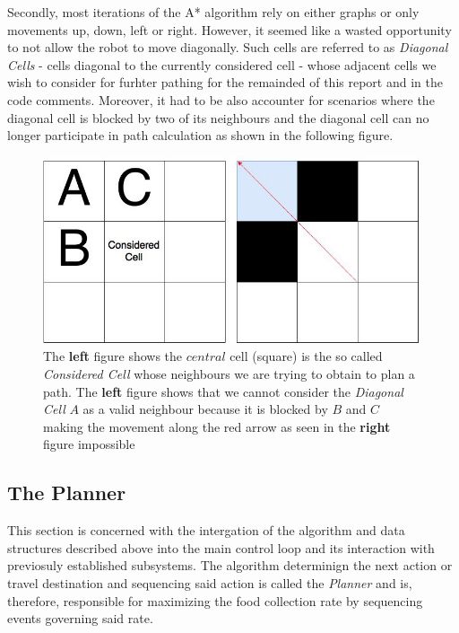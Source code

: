 \documentclass[11pt, a4paper]{article}
\begin{document}
Secondly, most iterations of the A* algorithm rely on either graphs\cite{path_astar_grid_no_grid}  or only movements up, down, left or right\cite{path_astar_grid_no_diagonals}. However, it seemed like a wasted opportunity to not allow the robot to move diagonally. Such cells are referred to as  \textit{Diagonal Cells} - cells diagonal to the currently considered cell - whose adjacent cells we wish to consider for furhter pathing for the remainded of this report and in the code comments. Moreover, it had to be also accounter for scenarios where the diagonal cell is blocked by two of its neighbours and the diagonal cell can no longer participate in path calculation as shown in the following figure.


\begin{figure}[H]
	  \centering
	  \includegraphics[width=30em]{../assets/fig_astar_diagonal.jpg}
          \caption{The \textbf{left} figure shows the $central$ cell (square) is the so called \textit{Considered Cell} whose neighbours we are trying to obtain to plan a path. The \textbf{left} figure shows that we cannot consider the \textit{Diagonal Cell} $A$ as a valid neighbour because it is blocked by $B$ and $C$ making the movement along the red arrow as seen in the \textbf{right} figure impossible}
\end{figure} 









\subsection{The Planner}

This section is concerned with the intergation of the algorithm and data structures described above into the main control loop and its interaction with previosuly established subsystems\cite{task2_report}. The algorithm determinign the next action or travel destination and sequencing said action is called the \textit{Planner} and is, therefore, responsible for maximizing the food collection rate by sequencing events governing said rate.
\end{document}
